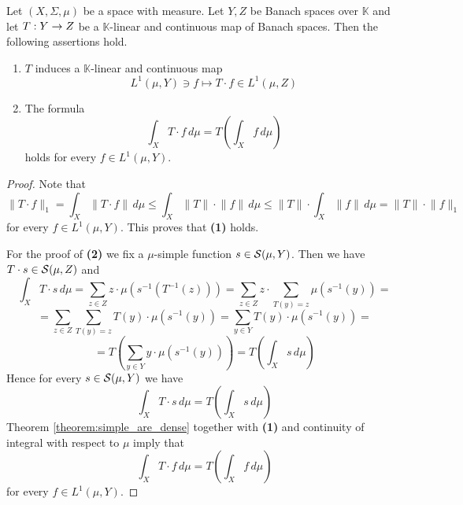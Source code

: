 \documentclass[10pt]{amsart}
\begin{document}
\begin{proposition}\label{proposition:Bochner_integral_commutes_with_any_continuous_linear_operation}
	Let $(X,\Sigma,\mu)$ be a space with measure. Let $Y, Z$ be Banach spaces over $\mathbb{K}$ and let $T:Y \rightarrow Z$ be a $\mathbb{K}$-linear and continuous map of Banach spaces. Then the following assertions hold.
	\begin{enumerate}[label=\emph{\textbf{(\arabic*)}}, leftmargin=*]
		\item $T$ induces a $\mathbb{K}$-linear and continuous map
		      $$L^1(\mu,Y) \ni f \mapsto T \cdot f \in L^1(\mu,Z)$$
		\item The formula
		      $$\int_X T\cdot f \,d\mu = T\left(\int_X f\,d\mu\right)$$
		      holds for every $f \in L^1(\mu,Y)$.
	\end{enumerate}
\end{proposition}
\begin{proof}
	Note that
	$$\lVert T\cdot f \rVert_1 = \int_X\lVert T\cdot f \rVert\,d\mu \leq \int_X \lVert T\rVert\cdot \lVert f \rVert\,d\mu \leq \lVert T\rVert\cdot \int_X  \lVert f \rVert\,d\mu = \lVert T\rVert\cdot \lVert f \rVert_1$$
	for every $f \in L^1(\mu,Y)$. This proves that \textbf{(1)} holds.

	For the proof of \textbf{(2)} we fix a $\mu$-simple function $s \in {\mathcal S}(\mu,Y)$. Then we have $T\cdot s \in {\mathcal S}(\mu,Z)$ and
	$$\int_X T\cdot s\,d\mu = \sum_{z \in Z}z \cdot \mu\left(s^{-1}\left(T^{-1}(z)\right)\right) = \sum_{z\in Z}z\cdot \sum_{T(y) = z}\mu\left(s^{-1}(y)\right) = $$
	$$= \sum_{z \in Z}\sum_{T(y) = z}T(y)\cdot \mu\left(s^{-1}(y)\right) = \sum_{y\in Y} T(y)\cdot \mu\left(s^{-1}(y)\right) = $$
	$$=T\left( \sum_{y\in Y} y\cdot \mu\left(s^{-1}(y)\right) \right) = T\left( \int_X s\,d\mu\right)$$
	Hence for every $s \in {\mathcal S}(\mu,Y)$ we have
	$$\int_X T\cdot s \,d\mu = T\left(\int_X s\,d\mu\right)$$
	Theorem \ref{theorem:simple_are_dense} together with \textbf{(1)} and continuity of integral with respect to $\mu$ imply that
	$$\int_X T\cdot f \,d\mu = T\left(\int_X f\,d\mu\right)$$
	for every $f \in L^1(\mu,Y)$.
\end{proof}
\end{document}
